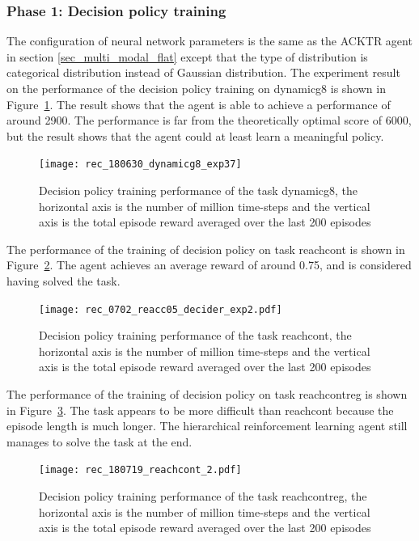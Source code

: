 \subsubsection{Phase 1: Decision policy training}
The configuration of neural network parameters is the same as the ACKTR agent in section \ref{sec_multi_modal_flat} except that the type of distribution is categorical distribution instead of Gaussian distribution.
The experiment result on the performance of the decision policy training on dynamicg8 is shown in Figure~\ref{fig:rec_dynamicg8_decider_subt10}. The result shows that the agent is able to achieve a performance of around 2900. The performance is far from the theoretically optimal score of 6000, but the result shows that the agent could at least learn a meaningful policy.

\begin{figure}[!htbp]
\centering
\texttt{[image: rec\_180630\_dynamicg8\_exp37]}
\caption{Decision policy training performance of the task dynamicg8, the horizontal axis is the number of million time-steps and the vertical axis is the total episode reward averaged over the last 200 episodes}
\label{fig:rec_dynamicg8_decider_subt10}
\end{figure}

The performance of the training of decision policy on task reachcont is shown in Figure~\ref{fig:rec_reachc05_decider_subt10}. The agent achieves an average reward of around 0.75, and is considered having solved the task.
\begin{figure}[!htbp]
\centering
\texttt{[image: rec\_0702\_reacc05\_decider\_exp2.pdf]}
\caption{Decision policy training performance of the task reachcont, the horizontal axis is the number of million time-steps and the vertical axis is the total episode reward averaged over the last 200 episodes}
\label{fig:rec_reachc05_decider_subt10}
\end{figure}

The performance of the training of decision policy on task reachcontreg is shown in Figure~\ref{rec_reachcontreg}. The task appears to be more difficult than reachcont because the episode length is much longer. The hierarchical reinforcement learning agent still manages to solve the task at the end.
\begin{figure}[!htbp]
	\centering
	\texttt{[image: rec\_180719\_reachcont\_2.pdf]}
	\caption{Decision policy training performance of the task reachcontreg, the horizontal axis is the number of million time-steps and the vertical axis is the total episode reward averaged over the last 200 episodes}
	\label{rec_reachcontreg}
\end{figure}

